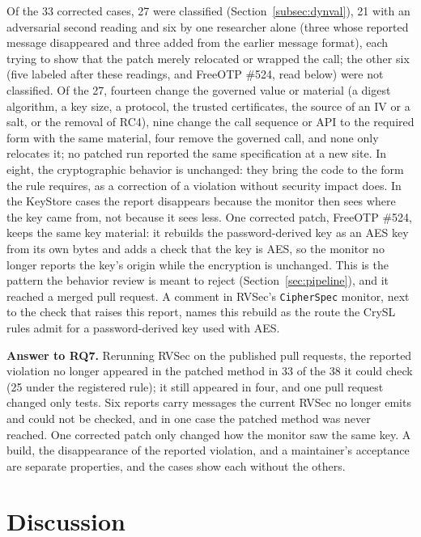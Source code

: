 \documentclass[conference]{IEEEtran}
\newcommand{\researchq}[1]{\textbf{RQ#1}}
\begin{document}
Of the 33 corrected cases, 27 were classified (Section~\ref{subsec:dynval}),
21 with an adversarial second reading and six by one researcher alone (three
whose reported message disappeared and three added from the earlier message
format), each trying to show that the patch merely relocated or wrapped the
call; the other six (five labeled after these readings, and FreeOTP \#524,
read below) were not classified. Of the 27,
fourteen change the
governed value or material (a digest algorithm, a key size, a protocol, the trusted
certificates, the source of an IV or a salt, or the removal of RC4), nine change the call sequence or API to the
required form with the same material, four remove the governed call, and none
only relocates it; no patched run reported the same specification at a new
site. In eight, the cryptographic behavior is unchanged: they bring the code to
the form the rule requires, as a correction of a violation without security
impact does. In the KeyStore cases the report disappears because the monitor
then sees where the key came from, not because it sees less. One corrected
patch, FreeOTP \#524, keeps the same key material: it rebuilds the
password-derived key as an AES key from its own bytes and adds a check that
the key is AES, so the monitor no longer reports the key's origin while the
encryption is unchanged. This is the pattern the behavior review is meant to
reject (Section~\ref{sec:pipeline}), and it reached a merged pull request.
A comment in RVSec's \texttt{CipherSpec} monitor, next to the check that
raises this report, names this rebuild as the route the CrySL rules admit for a
password-derived key used with AES.

\textbf{Answer to \researchq{7}.} Rerunning RVSec on the published pull
requests, the reported violation no longer appeared in the patched method in
33 of the 38 it could check (25 under the registered rule); it still appeared
in four, and one pull request
changed only tests. Six reports carry messages the current RVSec no longer
emits and could not be checked, and in one case the patched method was never
reached. One corrected patch only changed how the monitor saw the same key. A build, the disappearance of the reported violation, and a
maintainer's acceptance are separate properties, and the cases show each
without the others.

\section{Discussion}
\label{sec:discussion}
\end{document}
